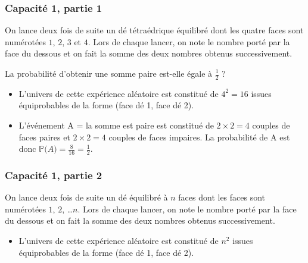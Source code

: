 \documentclass[11pt, hyperref={urlcolor=red,%
            linkcolor=blue, %
            colorlinks=true}]{beamer}
\newcommand{\proba}[1]{\mathbb{P}\big(#1\big)}
\begin{document}
\begin{frame}
\frametitle{Capacité 1,  partie 1}
\label{capacite1}
On lance deux fois de suite un dé tétraédrique  équilibré dont les quatre faces sont numérotées $1$, $2$, $3$ et $4$.
Lors de chaque lancer, on note le nombre porté par la face du dessous  et on fait la somme des deux nombres obtenus successivement.

La probabilité d'obtenir une somme paire est-elle égale à $\frac{1}{2}$ ?

\begin{itemize}
\pause \item L'univers de cette expérience aléatoire est constitué de $4^{2}=16$ issues équiprobables de la forme (face dé 1, face dé 2). 


\pause \item L'événement A = \og{} la somme est paire \fg{} est constitué de $2 \times 2 = 4$ couples de faces paires et $2 \times 2=4$  couples de faces impaires. La probabilité de A est donc $\proba{A}=\frac{8}{16}=\frac{1}{2}$.

\end{itemize}



\end{frame}


\begin{frame}
\frametitle{Capacité 1,  partie 2}
On lance deux fois de suite un dé   équilibré  à $n$ faces dont les  faces sont numérotées $1$, $2$, \ldots  $n$.
Lors de chaque lancer, on note le nombre porté par la face du dessous  et on fait la somme des deux nombres obtenus successivement.

\begin{itemize}
\pause \item L'univers de cette expérience aléatoire est constitué de $n^{2}$ issues équiprobables de la forme (face dé 1, face dé 2). 


\end{itemize}



\end{frame}
\end{document}
